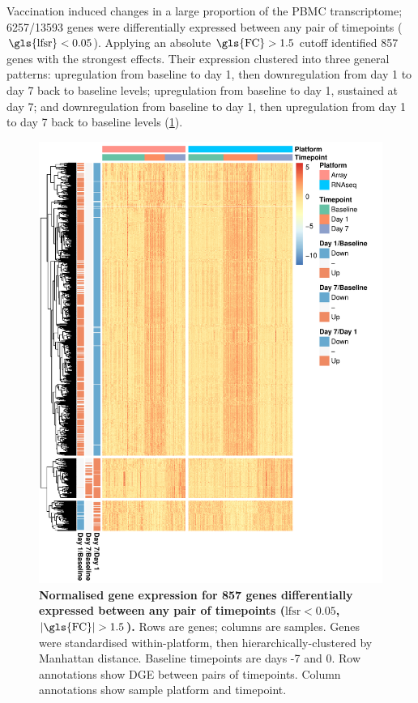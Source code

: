 Vaccination induced changes in a large proportion of the \gls{PBMC} transcriptome; \num{6257/13593} genes were differentially expressed between any pair of timepoints ($\text{\gls{lfsr}} < 0.05$).
Applying an absolute $\text{\gls{FC}} > 1.5$ cutoff identified 857 genes with the strongest effects.
Their expression clustered into three general patterns:
    upregulation from baseline to day 1, then downregulation from day 1 to day 7 back to baseline levels;
    upregulation from baseline to day 1, sustained at day 7; 
    and downregulation from baseline to day 1, then upregulation from day 1 to day 7 back to baseline levels (\cref{fig:hird_dge_heatmap}).
%
 
\begin{figure}
    \includegraphics[width=1.0\textwidth]{mainmatter/figures/chapter_02/plot_dge_eqtl.heatmap_dge.pdf}
    \caption{
        \textbf{Normalised gene expression for 857 genes differentially expressed between any pair of timepoints ($\text{lfsr} < 0.05$, $\lvert\text{\gls{FC}}\rvert > 1.5$).}
        Rows are genes; columns are samples.
        Genes were standardised within-platform, then hierarchically-clustered by Manhattan distance.
        Baseline timepoints are days -7 and 0.
        Row annotations show \gls{DGE} between pairs of timepoints.
        Column annotations show sample platform and timepoint.
    }
    \label{fig:hird_dge_heatmap}
\end{figure}

